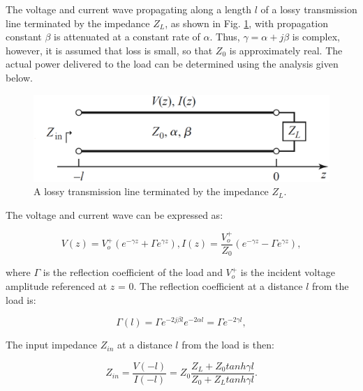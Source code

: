 The voltage and current wave propagating along a length $l$ of a lossy transmission line terminated by the impedance $Z_{L}$, as shown in Fig. \ref{th:fig2}, with propagation constant $\beta $ is attenuated at a constant rate of $\alpha $. Thus, $\gamma = \alpha + j\beta $ is complex, however, it is assumed that loss is small, so that $Z_{0}$ is approximately real. The actual power delivered to the load can be determined using the analysis given below.

\begin{figure}[H]
\centering
\includegraphics[scale=0.25]{chapter_2/fig2.eps}
\caption{A lossy transmission line terminated by the impedance $Z_{L}$.}
\label{th:fig2}
\end{figure}

\indent The voltage and current wave can be expressed as:

\begin{subequations}\label{th:eq14}
\begin{equation}\label{th:eq14a}
V(z)=V_{o}^{+}(e^{-\gamma z}+\Gamma e^{\gamma z}),
\end{equation}
\begin{equation}\label{th:eq14b}
I(z)=\frac{V_{o}^{+}}{Z_{0}}(e^{-\gamma z}-\Gamma e^{\gamma z}),
\end{equation}
\end{subequations}

\noindent where $\Gamma $ is the reflection coefficient of the load and $V_{o}^{+}$ is the incident
voltage amplitude referenced at $z$ = 0. The reflection coefficient at a distance $l$ from the load is:

\begin{equation}\label{th:eq15}
\Gamma (l)=\Gamma e^{-2j\beta l}e^{-2\alpha l}=\Gamma e^{-2\gamma l},
\end{equation}

\noindent The input impedance $Z_{in}$ at a distance $l$ from the load is then:

\begin{equation}\label{th:eq16}
Z_{in}=\frac{V(-l)}{I(-l)}=Z_{0}\frac{Z_{L}+Z_{0}tanh\gamma l}{Z_{0}+Z_{L}tanh\gamma l}.
\end{equation}


